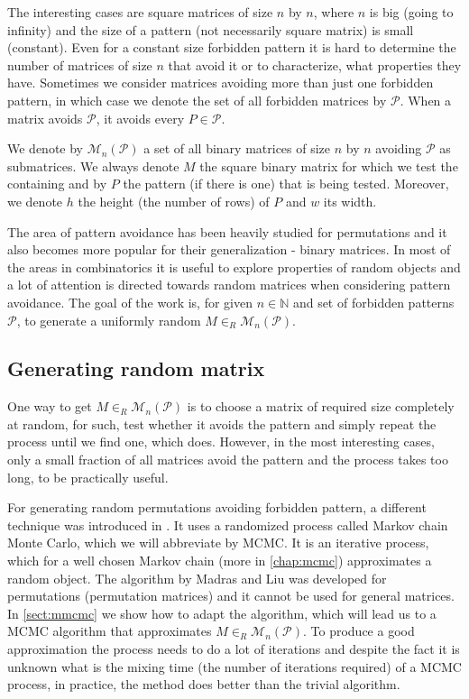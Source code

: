 The interesting cases are square matrices of size $n$ by $n$, where $n$ is big (going to infinity) and the size of a pattern (not necessarily square matrix) is small (constant). Even for a constant size forbidden pattern it is hard to determine the number of matrices of size $n$ that avoid it or to characterize, what properties they have. Sometimes we consider matrices avoiding more than just one forbidden pattern, in which case we denote the set of all forbidden matrices by $\mathcal{P}$. When a matrix avoids $\mathcal{P}$, it avoids every $P\in\mathcal{P}$. 
\begin{defn}
We denote by $\mathcal{M}_n(\mathcal{P})$ a set of all binary matrices of size $n$ by $n$ avoiding $\mathcal{P}$ as submatrices. We always denote $M$ the square binary matrix for which we test the containing and by $P$ the pattern (if there is one) that is being tested. Moreover, we denote $h$ the height (the number of rows) of $P$ and $w$ its width.
\end{defn}
The area of pattern avoidance has been heavily studied for permutations and it also becomes more popular for their generalization - binary matrices. In most of the areas in combinatorics it is useful to explore properties of random objects and a lot of attention is directed towards random matrices when considering pattern avoidance. The goal of the work is, for given $n\in\mathbb{N}$ and set of forbidden patterns $\mathcal{P}$, to generate a uniformly random $M\in_R\mathcal{M}_n(\mathcal{P})$.
\subsection*{Generating random matrix}
One way to get $M\in_R\mathcal{M}_n(\mathcal{P})$ is to choose a matrix of required size completely at random, for such, test whether it avoids the pattern and simply repeat the process until we find one, which does. However, in the most interesting cases, only a small fraction of all matrices avoid the pattern and the process takes too long, to be practically useful.

For generating random permutations avoiding forbidden pattern, a different technique was introduced in \cite{MadrasLiu}. It uses a randomized process called Markov chain Monte Carlo, which we will abbreviate by MCMC. It is an iterative process, which for a well chosen Markov chain (more in \autoref{chap:mcmc}) approximates a random object. The algorithm by Madras and Liu was developed for permutations (permutation matrices) and it cannot be used for general matrices. In \autoref{sect:mmcmc} we show how to adapt the algorithm, which will lead us to a MCMC algorithm that approximates $M\in_R\mathcal{M}_n(\mathcal{P})$. To produce a good approximation the process needs to do a lot of iterations and despite the fact it is unknown what is the mixing time (the number of iterations required) of a MCMC process, in practice, the method does better than the trivial algorithm.
